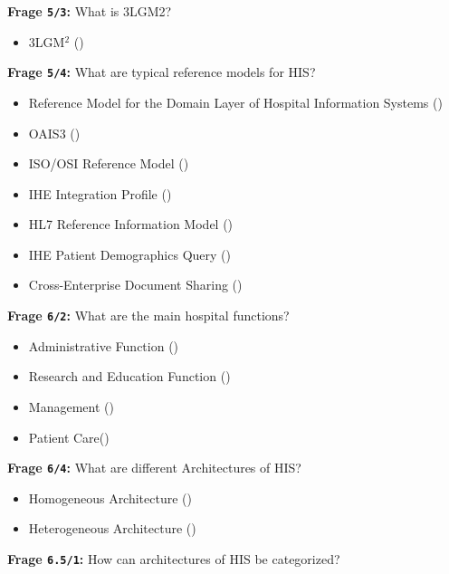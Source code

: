 \textbf{Frage \texttt{5/3}:} What is 3LGM2?

\begin{itemize}
  \item 3LGM$^{2}$ ()
\end{itemize}

\textbf{Frage \texttt{5/4}:} What are typical reference models for HIS?

\begin{itemize}
  \item Reference Model for the Domain Layer of Hospital Information Systems ()
  \item OAIS3 ()
  \item ISO/OSI Reference Model ()
  \item IHE Integration Profile ()
  \item HL7 Reference Information Model ()
  \item IHE Patient Demographics Query ()
  \item Cross-Enterprise Document Sharing ()
\end{itemize}

\textbf{Frage \texttt{6/2}:} What are the main hospital functions?

\begin{itemize}
  \item Administrative Function ()
  \item Research and Education Function ()
  \item Management ()
  \item Patient Care()
\end{itemize}

\textbf{Frage \texttt{6/4}:} What are different Architectures of HIS?

\begin{itemize}
  \item Homogeneous Architecture ()
  \item Heterogeneous Architecture ()
\end{itemize}

\textbf{Frage \texttt{6.5/1}:} How can architectures of HIS be categorized?

